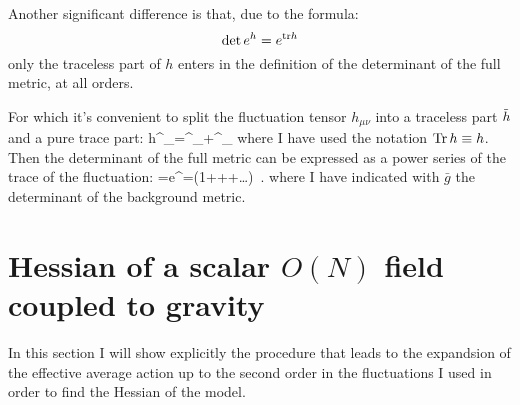Another significant difference is that,
due to the formula: 
\begin{equation}
 \det e^h=e^{\mathrm{tr} h}
\end{equation}
only the traceless part of $h$
enters in the definition of the determinant of the full metric, at all orders.

For which it's convenient to split the fluctuation tensor $h_{\mu\nu}$ into a traceless part $\tilde h$ and 
a pure trace part:
\be
h^\mu{}_\nu=\tilh^\mu{}_\nu+\delta^\mu_\nu
\ee
where I have used the notation $\operatorname{Tr} h \equiv h$.
Then the determinant of the full metric can be expressed as a power series of the trace of the fluctuation:
\be
{}=e^{}\sqrt{\bg}=\sqrt{\bg}\left(1+++\ldots\right)\ .
\ee
where I have indicated with $\bar{g}$ the determinant of the background metric.



\section{Hessian of a scalar $O(N)$ field coupled to gravity}
In this section I will show explicitly the procedure that leads to the  
expandsion of the effective average action up to the second order in the fluctuations I used in order to 
find the Hessian of the model.

